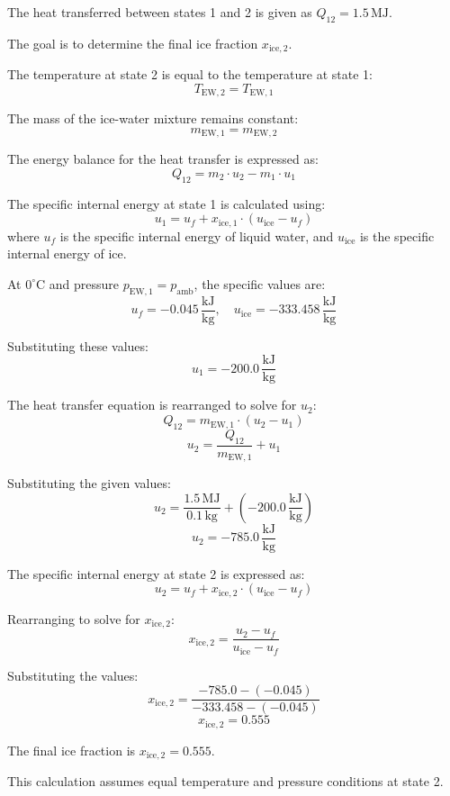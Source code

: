 The heat transferred between states 1 and 2 is given as \( Q_{12} = 1.5 \, \text{MJ} \).  

The goal is to determine the final ice fraction \( x_{\text{ice},2} \).  

The temperature at state 2 is equal to the temperature at state 1:  
\[
T_{\text{EW},2} = T_{\text{EW},1}
\]  

The mass of the ice-water mixture remains constant:  
\[
m_{\text{EW},1} = m_{\text{EW},2}
\]  

The energy balance for the heat transfer is expressed as:  
\[
Q_{12} = m_2 \cdot u_2 - m_1 \cdot u_1
\]  

The specific internal energy at state 1 is calculated using:  
\[
u_1 = u_f + x_{\text{ice},1} \cdot (u_{\text{ice}} - u_f)
\]  
where \( u_f \) is the specific internal energy of liquid water, and \( u_{\text{ice}} \) is the specific internal energy of ice.  

At \( 0^\circ\text{C} \) and pressure \( p_{\text{EW},1} = p_{\text{amb}} \), the specific values are:  
\[
u_f = -0.045 \, \frac{\text{kJ}}{\text{kg}}, \quad u_{\text{ice}} = -333.458 \, \frac{\text{kJ}}{\text{kg}}
\]  

Substituting these values:  
\[
u_1 = -200.0 \, \frac{\text{kJ}}{\text{kg}}
\]  

The heat transfer equation is rearranged to solve for \( u_2 \):  
\[
Q_{12} = m_{\text{EW},1} \cdot (u_2 - u_1)
\]  
\[
u_2 = \frac{Q_{12}}{m_{\text{EW},1}} + u_1
\]  

Substituting the given values:  
\[
u_2 = \frac{1.5 \, \text{MJ}}{0.1 \, \text{kg}} + (-200.0 \, \frac{\text{kJ}}{\text{kg}})
\]  
\[
u_2 = -785.0 \, \frac{\text{kJ}}{\text{kg}}
\]  

The specific internal energy at state 2 is expressed as:  
\[
u_2 = u_f + x_{\text{ice},2} \cdot (u_{\text{ice}} - u_f)
\]  

Rearranging to solve for \( x_{\text{ice},2} \):  
\[
x_{\text{ice},2} = \frac{u_2 - u_f}{u_{\text{ice}} - u_f}
\]  

Substituting the values:  
\[
x_{\text{ice},2} = \frac{-785.0 - (-0.045)}{-333.458 - (-0.045)}
\]  
\[
x_{\text{ice},2} = 0.555
\]  

The final ice fraction is \( x_{\text{ice},2} = 0.555 \).  

This calculation assumes equal temperature and pressure conditions at state 2.